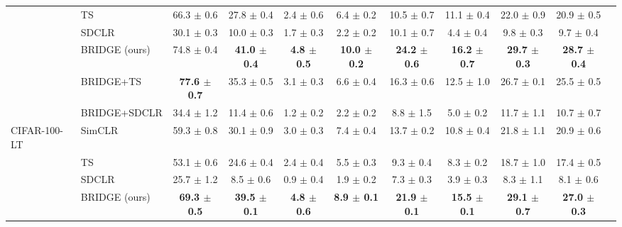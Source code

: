 \begin{table}[t]
\begin{adjustbox}{max width=\textwidth}
\begin{tabular}{l l c c c c c c c c c}
 & TS & 66.3 {\scriptsize$\pm$ 0.6} & 27.8 {\scriptsize$\pm$ 0.4} & 2.4 {\scriptsize$\pm$ 0.6} & 6.4 {\scriptsize$\pm$ 0.2} & 10.5 {\scriptsize$\pm$ 0.7} & 11.1 {\scriptsize$\pm$ 0.4} & 22.0 {\scriptsize$\pm$ 0.9} & 20.9 {\scriptsize$\pm$ 0.5} \\
 & SDCLR & 30.1 {\scriptsize$\pm$ 0.3} & 10.0 {\scriptsize$\pm$ 0.3} & 1.7 {\scriptsize$\pm$ 0.3} & 2.2 {\scriptsize$\pm$ 0.2} & 10.1 {\scriptsize$\pm$ 0.7} & 4.4 {\scriptsize$\pm$ 0.4} & 9.8 {\scriptsize$\pm$ 0.3} & 9.7 {\scriptsize$\pm$ 0.4} \\
 & \rowcolor{blue!10} BRIDGE (ours) & 74.8 {\scriptsize$\pm$ 0.4} & \textbf{41.0 {\scriptsize$\pm$ 0.4}} & \textbf{4.8 {\scriptsize$\pm$ 0.5}} & \textbf{10.0 {\scriptsize$\pm$ 0.2}} & \textbf{24.2 {\scriptsize$\pm$ 0.6}} & \textbf{16.2 {\scriptsize$\pm$ 0.7}} & \textbf{29.7 {\scriptsize$\pm$ 0.3}} & \textbf{28.7 {\scriptsize$\pm$ 0.4}} \\
 & BRIDGE+TS & \textbf{77.6 {\scriptsize$\pm$ 0.7}} & 35.3 {\scriptsize$\pm$ 0.5} & 3.1 {\scriptsize$\pm$ 0.3} & 6.6 {\scriptsize$\pm$ 0.4} & 16.3 {\scriptsize$\pm$ 0.6} & 12.5 {\scriptsize$\pm$ 1.0} & 26.7 {\scriptsize$\pm$ 0.1} & 25.5 {\scriptsize$\pm$ 0.5} \\
 & BRIDGE+SDCLR & 34.4 {\scriptsize$\pm$ 1.2} & 11.4 {\scriptsize$\pm$ 0.6} & 1.2 {\scriptsize$\pm$ 0.2} & 2.2 {\scriptsize$\pm$ 0.2} & 8.8 {\scriptsize$\pm$ 1.5} & 5.0 {\scriptsize$\pm$ 0.2} & 11.7 {\scriptsize$\pm$ 1.1} & 10.7 {\scriptsize$\pm$ 0.7} \\
\midrule
CIFAR-100-LT & SimCLR & 59.3 {\scriptsize$\pm$ 0.8} & 30.1 {\scriptsize$\pm$ 0.9} & 3.0 {\scriptsize$\pm$ 0.3} & 7.4 {\scriptsize$\pm$ 0.4} & 13.7 {\scriptsize$\pm$ 0.2} & 10.8 {\scriptsize$\pm$ 0.4} & 21.8 {\scriptsize$\pm$ 1.1} & 20.9 {\scriptsize$\pm$ 0.6} \\
 & TS & 53.1 {\scriptsize$\pm$ 0.6} & 24.6 {\scriptsize$\pm$ 0.4} & 2.4 {\scriptsize$\pm$ 0.4} & 5.5 {\scriptsize$\pm$ 0.3} & 9.3 {\scriptsize$\pm$ 0.4} & 8.3 {\scriptsize$\pm$ 0.2} & 18.7 {\scriptsize$\pm$ 1.0} & 17.4 {\scriptsize$\pm$ 0.5} \\
 & SDCLR & 25.7 {\scriptsize$\pm$ 1.2} & 8.5 {\scriptsize$\pm$ 0.6} & 0.9 {\scriptsize$\pm$ 0.4} & 1.9 {\scriptsize$\pm$ 0.2} & 7.3 {\scriptsize$\pm$ 0.3} & 3.9 {\scriptsize$\pm$ 0.3} & 8.3 {\scriptsize$\pm$ 1.1} & 8.1 {\scriptsize$\pm$ 0.6} \\
 & \rowcolor{blue!10} BRIDGE (ours) & \textbf{69.3 {\scriptsize$\pm$ 0.5}} & \textbf{39.5 {\scriptsize$\pm$ 0.1}} & \textbf{4.8 {\scriptsize$\pm$ 0.6}} & \textbf{8.9 {\scriptsize$\pm$ 0.1}} & \textbf{21.9 {\scriptsize$\pm$ 0.1}} & \textbf{15.5 {\scriptsize$\pm$ 0.1}} & \textbf{29.1 {\scriptsize$\pm$ 0.7}} & \textbf{27.0 {\scriptsize$\pm$ 0.3}} \\

\end{tabular}
\end{adjustbox}
\end{table}
